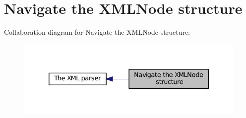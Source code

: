 \hypertarget{group__navigate}{\section{Navigate the X\-M\-L\-Node structure}
\label{group__navigate}
}
Collaboration diagram for Navigate the X\-M\-L\-Node structure\-:
\nopagebreak
\begin{figure}[H]
\begin{center}
\leavevmode
\includegraphics[width=332pt]{group__navigate}
\end{center}
\end{figure}
